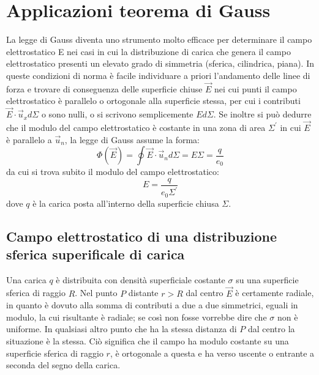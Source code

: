 \documentclass[class=book, crop=false, oneside, 12pt]{standalone}
\begin{document}
\section{Applicazioni teorema di Gauss}

La legge di Gauss diventa uno strumento molto efficace per determinare il campo elettrostatico E nei casi in cui la distribuzione di carica che genera il campo elettrostatico presenti un elevato grado di simmetria (sferica, cilindrica, piana).
In queste condizioni di norma è facile individuare a priori l'andamento delle linee di forza e trovare di conseguenza delle superficie chiuse \(\overrightarrow{E}\) nei cui punti il campo elettrostatico è parallelo o ortogonale alla superficie stessa, per cui i contributi \(\overrightarrow{E} \cdot \overrightarrow{u}_x d \Sigma\) o sono nulli, o si scrivono semplicemente \(E d \Sigma\). 
Se inoltre si può dedurre che il modulo del campo elettrostatico è costante in una zona di area \(\Sigma^{\prime}\) in cui \(\overrightarrow{E}\) è parallelo a \(\overrightarrow{u}_n\), la legge di Gauss assume la forma:
\begin{equation*}
    \Phi (\overrightarrow{E}) = \oint \overrightarrow{E} \cdot \overrightarrow{u}_n d \Sigma = E \Sigma = \frac{q}{e_0}
\end{equation*}
da cui si trova subito il modulo del campo elettrostatico: 
\begin{equation*}
    E = \frac{q}{e_0 \Sigma^{\prime}}
\end{equation*}
dove \(q\) è la carica posta all'interno della superficie chiusa \(\Sigma\). 

\subsection{Campo elettrostatico di una distribuzione sferica superificale di carica}
Una carica \(q\) è distribuita con densità superficiale costante \(\sigma\) su una superficie sferica di raggio \(R\).  
Nel punto \(P\) distante \(r > R\) dal centro \(\overrightarrow{E}\) è certamente radiale, in quanto è dovuto alla somma di contributi a due a due simmetrici, eguali in modulo, la cui risultante è radiale; se così non fosse vorrebbe dire che \(\sigma\) non è uniforme.  
In qualsiasi altro punto che ha la stessa distanza di \(P\) dal centro la situazione è la stessa. 
Ciò significa che il campo ha modulo costante su una superficie sferica di raggio \(r\), è  ortogonale a questa e ha verso uscente o entrante a seconda del segno della carica.
\end{document}
